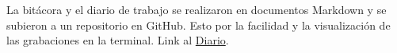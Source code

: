 La bitácora y el diario de trabajo se realizaron en documentos Markdown y se subieron a un repositorio en GitHub. Esto por la facilidad y la visualización de las grabaciones en la terminal. Link al \href{https://github.com/DSarceno/2022LabSimu201900109/blob/main/Practicas/README.md}{Diario}.